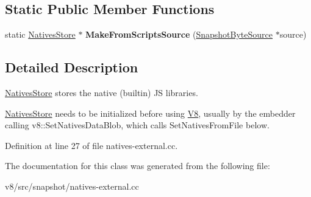 \subsection*{Static Public Member Functions}
\begin{DoxyCompactItemize}
\item 
\mbox{\label{classv8_1_1internal_1_1NativesStore_a66dd253bb883f30455bf975b88f5b961}} 
static \mbox{\hyperlink{classv8_1_1internal_1_1NativesStore}{Natives\+Store}} $\ast$ {\bfseries Make\+From\+Scripts\+Source} (\mbox{\hyperlink{classv8_1_1internal_1_1SnapshotByteSource}{Snapshot\+Byte\+Source}} $\ast$source)
\end{DoxyCompactItemize}


\subsection{Detailed Description}
\mbox{\hyperlink{classv8_1_1internal_1_1NativesStore}{Natives\+Store}} stores the \textquotesingle{}native\textquotesingle{} (builtin) JS libraries.

\mbox{\hyperlink{classv8_1_1internal_1_1NativesStore}{Natives\+Store}} needs to be initialized before using \mbox{\hyperlink{classv8_1_1internal_1_1V8}{V8}}, usually by the embedder calling v8\+::\+Set\+Natives\+Data\+Blob, which calls Set\+Natives\+From\+File below. 

Definition at line 27 of file natives-\/external.\+cc.



The documentation for this class was generated from the following file\+:\begin{DoxyCompactItemize}
\item 
v8/src/snapshot/natives-\/external.\+cc\end{DoxyCompactItemize}

